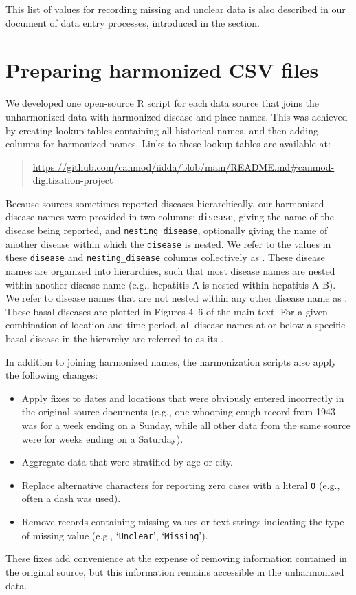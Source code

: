 \documentclass[12pt]{article}
\begin{document}
\noindent This list of values for recording missing and unclear data is also described in our document of data entry processes, introduced in the  section.

\clearpage

\section{Preparing harmonized CSV files}\label{sec:appendix-harmonized}

We developed one open-source R script for each data source that joins the unharmonized data with harmonized disease and place names. This was achieved by creating lookup tables containing all historical names, and then adding columns for harmonized names. Links to these lookup tables are available at:
\begin{quote}
\url{https://github.com/canmod/iidda/blob/main/README.md#canmod-digitization-project}
\end{quote}

Because sources sometimes reported diseases hierarchically, our harmonized disease names were provided in two columns: \texttt{disease}, giving the name of the disease being reported, and \texttt{nesting\_disease}, optionally giving the name of another disease within which the \texttt{disease} is nested. We refer to the values in these \texttt{disease} and \texttt{nesting\_disease} columns collectively as . These disease names are organized into hierarchies, such that most disease names are nested within another disease name (e.g., hepatitis-A is nested within hepatitis-A-B). We refer to disease names that are not nested within any other disease name as . These basal diseases are plotted in Figures 4--6 of the main text. For a given combination of location and time period, all disease names at or below a specific basal disease in the hierarchy are referred to as its .

In addition to joining harmonized names, the harmonization scripts also apply the following changes:
\begin{itemize}
\item Apply fixes to dates and locations that were obviously entered incorrectly in the original source documents (e.g., one whooping cough record from 1943 was for a week ending on a Sunday, while all other data from the same source were for weeks ending on a Saturday).
\item Aggregate data that were stratified by age or city.
\item Replace alternative characters for reporting zero cases with a literal \texttt{0} (e.g., often a dash was used).
\item Remove records containing missing values or text strings indicating the type of missing value (e.g., `\texttt{Unclear}', `\texttt{Missing}').
\end{itemize}
These fixes add convenience at the expense of removing information contained in the original source, but this information remains accessible in the unharmonized data.
\end{document}
